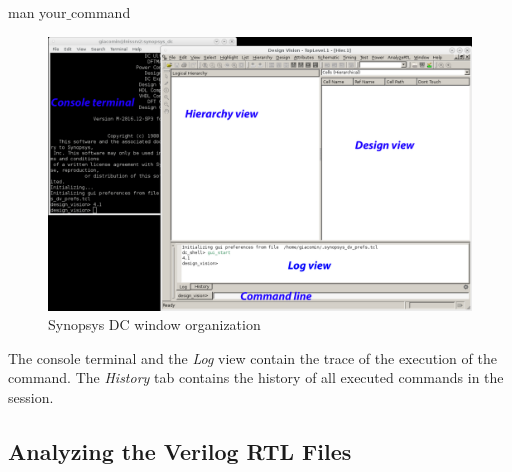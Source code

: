 	\begin{codeline}
	man your$\_$command
\end{codeline}


\begin{figure}[!h]
	\centering
	\includegraphics[scale=0.33]{figures/lab3_design_compiler/synopsys_overall.pdf}
	\caption{Synopsys DC window organization}
	\label{fig_syn_dc}
\end{figure}



The console terminal and the \textit{Log} view contain the trace of the execution of the command. The \textit{History} tab contains the history of all executed commands in the session.

\subsection{Analyzing the Verilog RTL Files}

